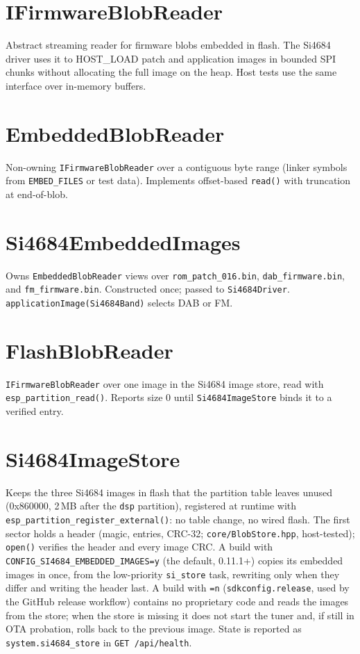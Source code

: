 
\section{IFirmwareBlobReader}\label{cls:IFirmwareBlobReader}
Abstract streaming reader for firmware blobs embedded in flash. The Si4684
driver uses it to HOST\_LOAD patch and application images in bounded SPI
chunks without allocating the full image on the heap. Host tests use the
same interface over in-memory buffers.

\section{EmbeddedBlobReader}\label{cls:EmbeddedBlobReader}
Non-owning \texttt{IFirmwareBlobReader} over a contiguous byte range (linker
symbols from \texttt{EMBED\_FILES} or test data). Implements offset-based
\texttt{read()} with truncation at end-of-blob.

\section{Si4684EmbeddedImages}\label{cls:Si4684EmbeddedImages}
Owns \texttt{EmbeddedBlobReader} views over \texttt{rom\_patch\_016.bin},
\texttt{dab\_firmware.bin}, and \texttt{fm\_firmware.bin}. Constructed once;
passed to \texttt{Si4684Driver}. \texttt{applicationImage(Si4684Band)} selects
DAB or FM.

\section{FlashBlobReader}\label{cls:FlashBlobReader}
\texttt{IFirmwareBlobReader} over one image in the Si4684 image store,
read with \texttt{esp\_partition\_read()}. Reports size 0 until
\texttt{Si4684ImageStore} binds it to a verified entry.

\section{Si4684ImageStore}\label{cls:Si4684ImageStore}
Keeps the three Si4684 images in flash that the partition table leaves
unused (0x860000, 2\,MB after the \texttt{dsp} partition), registered at
runtime with \texttt{esp\_partition\_register\_external()}: no table change,
no wired flash. The first sector holds a header (magic, entries, CRC-32;
\texttt{core/BlobStore.hpp}, host-tested); \texttt{open()} verifies the
header and every image CRC. A build with
\texttt{CONFIG\_SI4684\_EMBEDDED\_IMAGES=y} (the default, 0.11.1+) copies
its embedded images in once, from the low-priority \texttt{si\_store}
task, rewriting only when they differ and writing the header last. A
build with \texttt{=n} (\texttt{sdkconfig.release}, used by the GitHub
release workflow) contains no proprietary code and reads the images from
the store; when the store is missing it does not start the tuner and, if
still in OTA probation, rolls back to the previous image. State is
reported as \texttt{system.si4684\_store} in \texttt{GET /api/health}.

